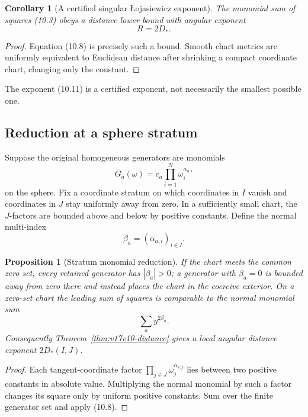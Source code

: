 \documentclass[11pt]{article}
\newtheorem{proposition}[theorem]{Proposition}
\newtheorem{corollary}[theorem]{Corollary}
\theoremstyle{remark}
\begin{document}
\begin{corollary}[A certified singular Łojasiewicz exponent]
\label{cor:v17v10-exponent}
The monomial sum of squares (10.3) obeys a distance lower bound with
angular exponent
\[
 R=2D_*.                                            \tag{10.11}
\]
\end{corollary}

\begin{proof}
Equation (10.8) is precisely such a bound.  Smooth chart metrics are
uniformly equivalent to Euclidean distance after shrinking a compact
coordinate chart, changing only the constant.
\end{proof}

The exponent (10.11) is a certified exponent, not necessarily the
smallest possible one.

\subsection{Reduction at a sphere stratum}

Suppose the original homogeneous generators are monomials
\[
 G_a(\omega)=c_a\prod_{i=1}^N\omega_i^{\alpha_{a,i}}
                                                               \tag{10.12}
\]
on the sphere.  Fix a coordinate stratum on which coordinates in
\(I\) vanish and coordinates in \(J\) stay uniformly away from zero.
In a sufficiently small chart, the \(J\)-factors are bounded above
and below by positive constants.  Define the normal multi-index
\[
 \beta_a=(\alpha_{a,i})_{i\in I}.                  \tag{10.13}
\]

\begin{proposition}[Stratum monomial reduction]
\label{prop:v17v10-stratum}
If the chart meets the common zero set, every retained generator has
\(|\beta_a|>0\); a generator with \(\beta_a=0\) is bounded away from
zero there and instead places the chart in the coercive exterior.
On a zero-set chart the leading sum of squares is comparable to the
normal monomial sum
\[
 \sum_a y^{2\beta_a}.                               \tag{10.14}
\]
Consequently Theorem~\ref{thm:v17v10-distance} gives a local angular
distance exponent \(2D_*(I,J)\).
\end{proposition}

\begin{proof}
Each tangent-coordinate factor
\(\prod_{j\in J}\omega_j^{\alpha_{a,j}}\) lies between two positive
constants in absolute value.  Multiplying the normal monomial by
such a factor changes its square only by uniform positive
constants.  Sum over the finite generator set and apply (10.8).
\end{proof}
\end{document}
